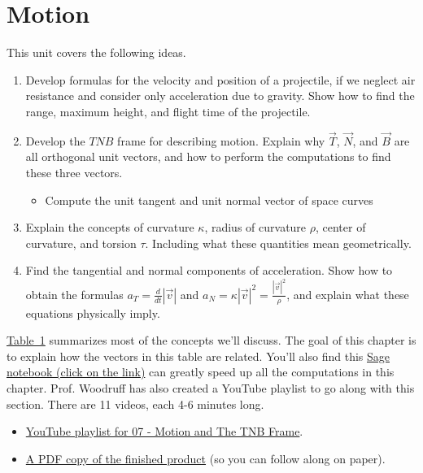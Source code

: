 \documentclass[10pt,]{book}
\theoremstyle{plain}
\theoremstyle{definition}
\theoremstyle{definition}
\theoremstyle{definition}
\theoremstyle{definition}
\theoremstyle{definition}
\numberwithin{equation}{section}
\newcommand{\sageurlforcurvature}{http://bmw.byuimath.com/dokuwiki/doku.php?id=curvature_calculator}
\begin{document}
\chapter[{Motion}]{Motion}\label{chapter-8}
This unit covers the following ideas. \leavevmode%
\begin{enumerate}
\item\hypertarget{li-90}{}Develop formulas for the velocity and position of a projectile, if we neglect air resistance and consider only acceleration due to gravity. Show how to find the range, maximum height, and flight time of the projectile.%
\item\hypertarget{li-91}{}Develop the \(TNB\) frame for describing motion. Explain why \(\vec T\), \(\vec N\), and \(\vec B\) are all orthogonal unit vectors, and how to perform the computations to find these three vectors. %
\begin{itemize}[label=\textbullet]
\item{}Compute the unit tangent and unit normal vector of space curves%
\end{itemize}
%
\item\hypertarget{li-93}{}Explain the concepts of curvature \(\kappa\), radius of curvature \(\rho\), center of curvature, and torsion \(\tau\). Including what these quantities mean geometrically.%
\item\hypertarget{li-94}{}Find the tangential and normal components of acceleration. Show how to obtain the formulas \(a_T=\frac{d}{dt}|\vec v|\) and \(a_N=\kappa |\vec v|^2=\frac{|\vec v|^2}{\rho}\), and explain what these equations physically imply.%
\end{enumerate}
%
\par
\hyperref[motion_table]{Table~1} summarizes most of the concepts we'll discuss. The goal of this chapter is to explain how the vectors in this table are related. You'll also find this \href{\\sageurlforcurvature}{Sage notebook (click on the link)} can greatly speed up all the computations in this chapter. Prof. Woodruff has also created a YouTube playlist to go along with this section. There are 11 videos, each 4-6 minutes long. \leavevmode%
\begin{itemize}[label=\textbullet]
\item{}\href{http://www.youtube.com/playlist?list=PL30EE81142B1ED1F0\&feature=plcp}{YouTube playlist for 07 - Motion and The TNB Frame}.%
\item{}\href{http://db.tt/FmEGk9p5}{A PDF copy of the finished product} (so you can follow along on paper).%
\end{itemize}
\end{document}
